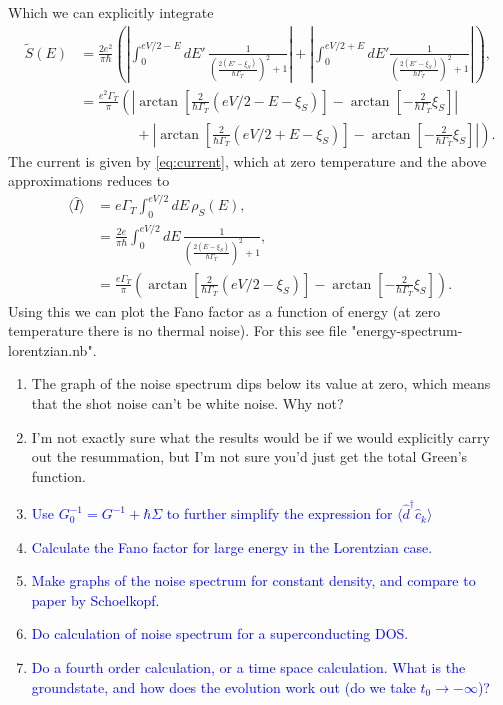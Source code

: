Which we can explicitly integrate
\begin{align}
    \tilde{S}(E) &= \frac{2e^2}{\pi\hbar}\left(\left|\int_0^{eV/2-E}dE'\,\frac{1}{\left(\frac{2(E'-\xi_S)}{\hbar\Gamma_T}\right)^2+1}\right|+\left|\int_0^{eV/2+E}dE'\frac{1}{\left(\frac{2(E'-\xi_S)}{\hbar\Gamma_T}\right)^2+1}\right|\right),\\
    &=\frac{e^2\Gamma_T}{\pi}\left(\left|\arctan\left[\frac{2}{\hbar \Gamma_T}(eV/2-E-\xi_S)\right]-\arctan\left[-\frac{2}{\hbar \Gamma_T}\xi_S\right]\right|\right.\\
    &\left.\qquad\qquad+\left|\arctan\left[\frac{2}{\hbar \Gamma_T}(eV/2+E-\xi_S)\right]-\arctan\left[-\frac{2}{\hbar \Gamma_T}\xi_S\right]\right|
    \right).
\end{align}
The current is given by \autoref{eq:current}, which at zero temperature and the above approximations reduces to
\begin{align}
    \langle \hat{I} \rangle &= e\Gamma_T\int_0^{eV/2}dE\,\rho_S(E),\\
    &=\frac{2e}{\pi\hbar}\int_0^{eV/2}dE\,\frac{1}{\left(\frac{2(E-\xi_S)}{\hbar\Gamma_T}\right)^2+1},\\
    &=\frac{e\Gamma_T}{\pi}\left(\arctan\left[\frac{2}{\hbar \Gamma_T}(eV/2-\xi_S)\right]-\arctan\left[-\frac{2}{\hbar \Gamma_T}\xi_S\right]\right).
\end{align}
Using this we can plot the Fano factor as a function of energy (at zero temperature there is no thermal noise). For this see file "energy-spectrum-lorentzian.nb".
\begin{tcolorbox}[title = Questions/Ideas, colback = gray!5, colframe=black]
    \begin{enumerate}
        \item The graph of the noise spectrum dips below its value at zero, which means that the shot noise can't be white noise. Why not?
        \item I'm not exactly sure what the results would be if we would explicitly carry out the resummation, but I'm not sure you'd just get the total Green's function.
        \item \textcolor{blue}{Use $G_0^{-1} = G^{-1}+\hbar\Sigma$ to further simplify the expression for $\langle\hat{d}^\dagger\hat{c}_k\rangle$}
        \item \textcolor{blue}{Calculate the Fano factor for large energy in the Lorentzian case.}
        \item \textcolor{blue}{Make graphs of the noise spectrum for constant density, and compare to paper by Schoelkopf.}
        \item \textcolor{blue}{Do calculation of noise spectrum for a superconducting DOS.}
        \item \textcolor{blue}{Do a fourth order calculation, or a time space calculation. What is the groundstate, and how does the evolution work out (do we take $t_0 \rightarrow -\infty$)?}
    \end{enumerate}
\end{tcolorbox}

